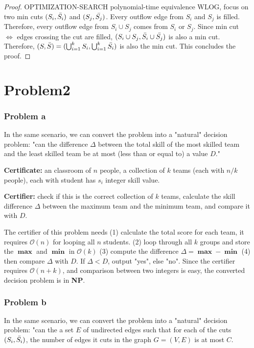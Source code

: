 \documentclass[openany]{article}
\begin{document}
\begin{proof}{}{OPTIMIZATION-SEARCH polynomial-time equivalence}
WLOG, focus on two min cuts $(S_i,\Bar{S_i})$ and $(S_j, \Bar{S_j})$. Every outflow edge from $S_i$ and $S_j$ is filled. Therefore, every outflow edge from $S_i \cup S_j$ comes from $S_i$ or $S_j$. Since min cut $\Leftrightarrow$ edges crossing the cut are filled, $(S_i \cup S_j, \Bar{S_i} \cup \Bar{S_j})$ is also a min cut. Therefore, $(S,\Bar{S}) = (\bigcup_{i=1}^{k}{S_i},\bigcup_{i=1}^{k}\Bar{S_i})$ is also the min cut. This concludes the proof.





\end{proof}


\section*{Problem2}
\subsubsection*{Problem a}
In the same scenario, we can convert the problem into a "natural" decision problem: "can the difference $\Delta$ between the total skill of the most skilled team and the least skilled team be at most (less than or equal to) a value $D$." 

\textbf{Certificate:} an classroom of $n$ people, a collection of $k$ teams (each with $n/k$ people), each with student has $s_i$ integer skill value.

\textbf{Certifier:} check if this is the correct collection of $k$ teams, calculate the skill difference $\Delta$ between the maximum team and the minimum team, and compare it with $D$.

The certifier of this problem needs (1) calculate the total score for each team, it requires $\mathcal{O}(n)$ for looping all $n$ students. (2) loop through all $k$ groups and store the $\mathbf{\max}$ and $\mathbf{\min}$ in $\mathcal{O}(k)$ (3) compute the difference $\Delta = \mathbf{\max} - \mathbf{\min}$ (4) then compare $\Delta$ with $D$. If $\Delta < D$, output "yes", else "no". Since the certifier requires $\mathcal{O}(n+k)$, and comparison between two integers is easy, the converted decision problem is in \textbf{NP}.

\subsubsection*{Problem b}
In the same scenario, we can convert the problem into a "natural" decision problem: "can the a set $E$ of undirected edges such that for each of the cuts $(S_i, \Bar{S_i})$, the number of edges it cuts in the graph $G=(V, E)$ is at most $C$.
\end{document}
